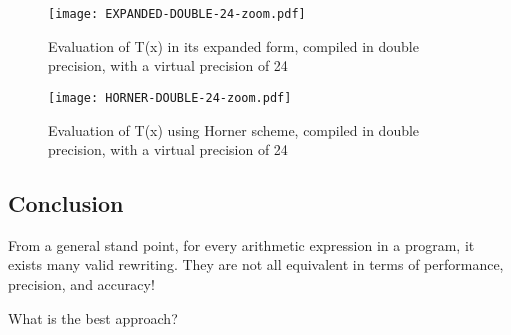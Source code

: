 \begin{figure}[h]
  \center \texttt{[image: EXPANDED-DOUBLE-24-zoom.pdf]}
  \caption{Evaluation of T(x) in its expanded form, compiled in double
    precision, with a virtual precision of 24}
  \label{fig:expanded:double:24:zoom}
\end{figure}

\begin{figure}[h]
  \center \texttt{[image: HORNER-DOUBLE-24-zoom.pdf]}
  \caption{Evaluation of T(x) using Horner scheme, compiled in double precision,
    with a virtual precision of 24}
    \label{fig:horner:double:24:zoom}
\end{figure}

\subsection{Conclusion}


From a general stand point, for every arithmetic expression in a program, it exists many valid rewriting. They are not all equivalent in terms of performance, precision, and accuracy!

\begin{question}
What is the best approach?
\end{question}

\FloatBarrier


